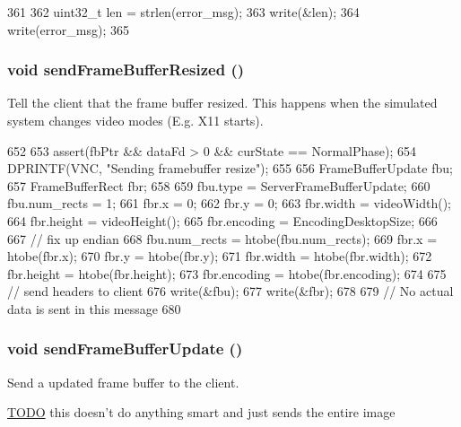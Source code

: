 \begin{DoxyCode}
361 {
362    uint32_t len = strlen(error_msg);
363    write(&len);
364    write(error_msg);
365 }
\end{DoxyCode}
\hypertarget{classVncServer_a046eae8a3566418d4f03a95de5d1af13}{
\subsubsection[{sendFrameBufferResized}]{\setlength{\rightskip}{0pt plus 5cm}void sendFrameBufferResized ()}}
\label{classVncServer_a046eae8a3566418d4f03a95de5d1af13}
Tell the client that the frame buffer resized. This happens when the simulated system changes video modes (E.g. X11 starts). 


\begin{DoxyCode}
652 {
653     assert(fbPtr && dataFd > 0 && curState == NormalPhase);
654     DPRINTF(VNC, "Sending framebuffer resize\n");
655 
656     FrameBufferUpdate fbu;
657     FrameBufferRect fbr;
658 
659     fbu.type = ServerFrameBufferUpdate;
660     fbu.num_rects = 1;
661     fbr.x = 0;
662     fbr.y = 0;
663     fbr.width = videoWidth();
664     fbr.height = videoHeight();
665     fbr.encoding = EncodingDesktopSize;
666 
667     // fix up endian
668     fbu.num_rects = htobe(fbu.num_rects);
669     fbr.x = htobe(fbr.x);
670     fbr.y = htobe(fbr.y);
671     fbr.width = htobe(fbr.width);
672     fbr.height = htobe(fbr.height);
673     fbr.encoding = htobe(fbr.encoding);
674 
675     // send headers to client
676     write(&fbu);
677     write(&fbr);
678 
679     // No actual data is sent in this message
680 }
\end{DoxyCode}
\hypertarget{classVncServer_a12fdf8396c8fe33bb93e66d7491fb497}{
\subsubsection[{sendFrameBufferUpdate}]{\setlength{\rightskip}{0pt plus 5cm}void sendFrameBufferUpdate ()}}
\label{classVncServer_a12fdf8396c8fe33bb93e66d7491fb497}
Send a updated frame buffer to the client. \begin{Desc}
\item[\hyperlink{todo__todo000011}{TODO}]this doesn't do anything smart and just sends the entire image \end{Desc}



